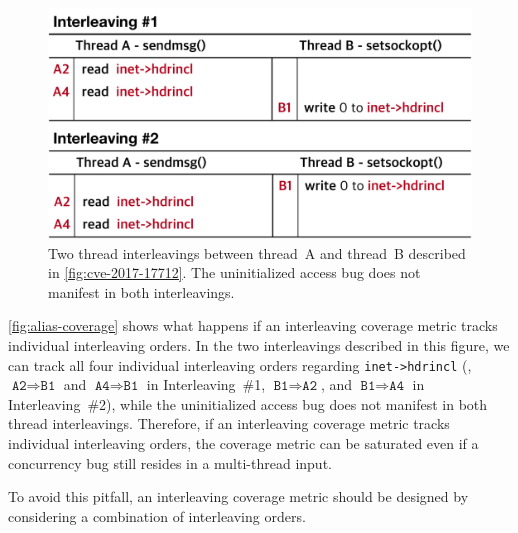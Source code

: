 \begin{figure}[t]
  \centering
  \includegraphics[width=0.90\linewidth]{fig/alias-coverage.pdf}
  \caption{Two thread interleavings between thread~A and thread~B
    described in \autoref{fig:cve-2017-17712}. The uninitialized
    access bug does not manifest in both interleavings.}
  \label{fig:alias-coverage}
\end{figure}
%
\autoref{fig:alias-coverage} shows what happens if an interleaving
coverage metric tracks individual interleaving orders.
%
In the two interleavings described in this figure, we can track all
four individual interleaving orders regarding \texttt{inet->hdrincl}
(\ie, $\texttt{A2} \Rightarrow \texttt{B1}$ and
$\texttt{A4} \Rightarrow \texttt{B1}$ in Interleaving~\#1,
$\texttt{B1} \Rightarrow \texttt{A2}$, and
$\texttt{B1} \Rightarrow \texttt{A4}$ in Interleaving~\#2), while the
uninitialized access bug does not manifest in both thread
interleavings.
%
Therefore, if an interleaving coverage metric tracks individual
interleaving orders, the coverage metric can be saturated even if a
concurrency bug still resides in a multi-thread input.

To avoid this pitfall, an interleaving coverage metric should be
designed by considering a combination of interleaving orders.





